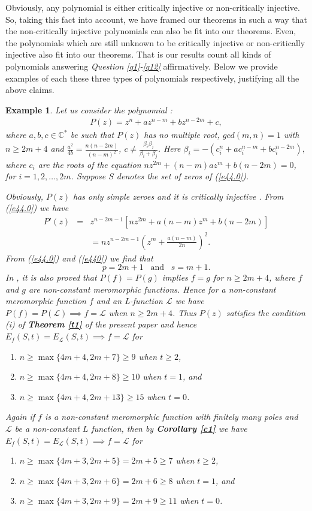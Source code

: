 \documentclass[a4paper,draft]{amsproc}
\theoremstyle{plain}
\newtheorem{exm}{Example}[section]
\theoremstyle{definition}
\theoremstyle{remark}
\newcommand{\bea}{\begin{eqnarray}}
\newcommand{\eea}{\end{eqnarray}}
\numberwithin{equation}{section}
\begin{document}
Obviously, any polynomial is either critically injective or non-critically injective. So, taking this fact into account, we have framed our theorems in such a way that the non-critically injective polynomials can also be fit into our theorems.  Even, the polynomials which are still unknown to be critically injective or non-critically injective also fit into our theorems. That is our results count all kinds of polynomials answering {\em Question \ref{q1}-\ref{q12}} affirmatively. Below we provide examples of each these three types of polynomials respectively, justifying all the above claims.	
\begin{exm}
	Let us consider the  polynomial :
	\bea\label{e44.0} P(z)=z^n+az^{n-m}+bz^{n-2m}+c,\eea
	where $a, b, c\in\mathbb{C}^*$ be such that $P(z)$ has no multiple root, $gcd(m, n) = 1$ with $n\geq2m+4$ and $\frac{a^2}{4b}=\frac{n(n-2m)}{(n-m)^2}$, $c\ne \frac{\beta_i\beta_j}{\beta_i+\beta_j}$. Here $\beta_i=-(c_i^n+ac_i^{n-m}+bc_i^{n-2m}),$ where $c_i$ are the roots
	of the equation $nz^{2m} + (n- m)az^m + b(n-2m) = 0$, for $i = 1, 2, \ldots, 2m$. 
	Suppose $S$ denotes the set of zeros of (\ref{e44.0}).
	\vspace{0.1in}\par  Obviously,  $P(z)$ has only simple zeroes and it is critically injective \cite[see Lemma 2.7]{3a}. 
	From (\ref{e44.0}) we have \bea\label{e440} P'(z)&=&z^{n-2m-1}[nz^{2m}+a(n-m)z^m+b(n-2m)]\\\nonumber&&=nz^{n-2m-1}\left(z^m+\frac{a(n-m)}{2n}\right)^2.\eea
	From (\ref{e44.0}) and (\ref{e440}) we find that $$p=2m+1 \;\;\; \mbox{and} \;\;\;s=m+1.$$
	In \cite[see proof of Theorem 1.1]{3a}, it is also proved that $P(f)=P(g)$ implies $f=g$ for $n\geq 2m+4$, where $f$and $g$ are non-constant meromorphic functions. Hence for a non-constant meromorphic function $f$ and an L-function  $\mathcal{L}$ we have $P(f)=P(\mathcal{L})\implies f=\mathcal{L}$ when $n\geq 2m+4$. Thus $P(z)$ satisfies the condition (i) of {\em\bf Theorem \ref{t1}} of the present paper and  hence $E_f(S, t)=E_{\mathcal{L}}(S,t)\implies f=\mathcal{L}$ for
	\begin{enumerate}
		\item $n\geq\max\{4m+4,2m+7\}\geq 9$ when $t \geq 2$,
		\item  $n\geq\max\{4m+4,2m+8\}\geq 10$ when $t = 1$, and
		\item  $n\geq\max\{4m+4,2m+13\}\geq 15$ when $t = 0$.
	\end{enumerate}
	Again if $f$ is a non-constant meromorphic function with finitely many poles and $\mathcal{L}$ be a non-constant $L$ function, then by {\em\bf Corollary \ref{c1}} we have $E_f(S, t)=E_\mathcal{L}(S,t)\implies f=\mathcal{L}$ for  
	\begin{enumerate}
		\item $n \geq \max\{ 4m+3,2m+5\}=2m+5 \geq 7$ when $t\geq 2 $,
		\item  $n \geq \max\{ 4m+3,2m+6\}=2m+6 \geq 8$ when $t=1 $, and
		\item  $n \geq \max\{ 4m+3,2m+9\}=2m+9 \geq 11$ when $t=0 $.
	\end{enumerate} 
	
\end{exm}
\end{document}
